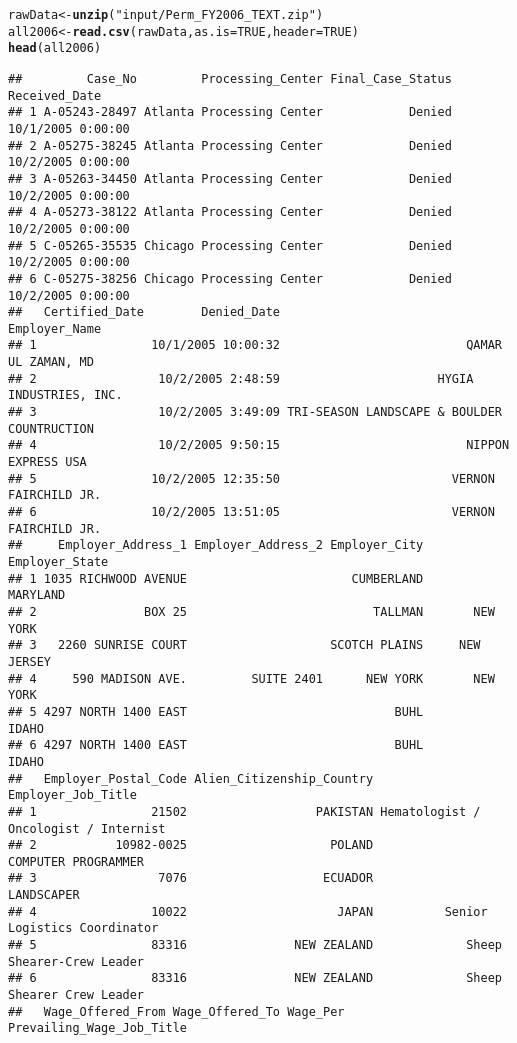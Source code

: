 \documentclass{article}\usepackage{graphicx, color}
\makeatletter
\newcommand{\hlfunctioncall}[1]{\textcolor[rgb]{0.501960784313725,0,0.329411764705882}{\textbf{#1}}}%
\newcommand{\hlstring}[1]{\textcolor[rgb]{0.6,0.6,1}{#1}}%
\newenvironment{kframe}{%
 \def\at@end@of@kframe{}%
 \ifinner\ifhmode%
  \def\at@end@of@kframe{\end{minipage}}%
  \begin{minipage}{\columnwidth}%
 \fi\fi%
 \def\FrameCommand##1{\hskip\@totalleftmargin \hskip-\fboxsep
 \colorbox{shadecolor}{##1}\hskip-\fboxsep
     \hskip-\linewidth \hskip-\@totalleftmargin \hskip\columnwidth}%
 \MakeFramed {\advance\hsize-\width
   \@totalleftmargin\z@ \linewidth\hsize
   \@setminipage}}%
 {\par\unskip\endMakeFramed%
 \at@end@of@kframe}
\newenvironment{knitrout}{}{} %
\makeatother
\begin{document}
\begin{knitrout}
\begin{kframe}
\begin{alltt}
rawData <- \hlfunctioncall{unzip}(\hlstring{"input/Perm_FY2006_TEXT.zip"})
all2006 <- \hlfunctioncall{read.csv}(rawData, as.is = TRUE, header = TRUE)
\hlfunctioncall{head}(all2006)
\end{alltt}
\begin{verbatim}
##         Case_No         Processing_Center Final_Case_Status     Received_Date
## 1 A-05243-28497 Atlanta Processing Center            Denied 10/1/2005 0:00:00
## 2 A-05275-38245 Atlanta Processing Center            Denied 10/2/2005 0:00:00
## 3 A-05263-34450 Atlanta Processing Center            Denied 10/2/2005 0:00:00
## 4 A-05273-38122 Atlanta Processing Center            Denied 10/2/2005 0:00:00
## 5 C-05265-35535 Chicago Processing Center            Denied 10/2/2005 0:00:00
## 6 C-05275-38256 Chicago Processing Center            Denied 10/2/2005 0:00:00
##   Certified_Date        Denied_Date                               Employer_Name
## 1                10/1/2005 10:00:32                          QAMAR UL ZAMAN, MD
## 2                 10/2/2005 2:48:59                      HYGIA INDUSTRIES, INC.
## 3                 10/2/2005 3:49:09 TRI-SEASON LANDSCAPE & BOULDER COUNTRUCTION
## 4                 10/2/2005 9:50:15                          NIPPON EXPRESS USA
## 5                10/2/2005 12:35:50                        VERNON FAIRCHILD JR.
## 6                10/2/2005 13:51:05                        VERNON FAIRCHILD JR.
##     Employer_Address_1 Employer_Address_2 Employer_City Employer_State
## 1 1035 RICHWOOD AVENUE                       CUMBERLAND       MARYLAND
## 2               BOX 25                          TALLMAN       NEW YORK
## 3   2260 SUNRISE COURT                    SCOTCH PLAINS     NEW JERSEY
## 4     590 MADISON AVE.         SUITE 2401      NEW YORK       NEW YORK
## 5 4297 NORTH 1400 EAST                             BUHL          IDAHO
## 6 4297 NORTH 1400 EAST                             BUHL          IDAHO
##   Employer_Postal_Code Alien_Citizenship_Country                    Employer_Job_Title
## 1                21502                  PAKISTAN Hematologist / Oncologist / Internist
## 2           10982-0025                    POLAND                   COMPUTER PROGRAMMER
## 3                 7076                   ECUADOR                            LANDSCAPER
## 4                10022                     JAPAN          Senior Logistics Coordinator
## 5                83316               NEW ZEALAND             Sheep Shearer-Crew Leader
## 6                83316               NEW ZEALAND             Sheep Shearer Crew Leader
##   Wage_Offered_From Wage_Offered_To Wage_Per            Prevailing_Wage_Job_Title

\end{verbatim}
\end{kframe}
\end{knitrout}
\end{document}
